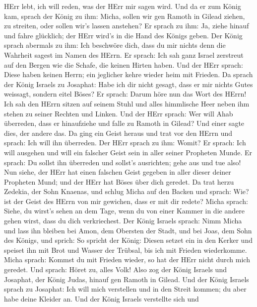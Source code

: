 HErr lebt, ich will reden, was der HErr mir sagen wird. 
Und da er zum König kam, sprach der König zu ihm: Micha, sollen wir gen
Ramoth in Gilead ziehen, zu streiten, oder sollen wir's lassen anstehen?
Er sprach zu ihm: Ja, ziehe hinauf und fahre glücklich; der HErr wird's
in die Hand des Königs geben.  Der König sprach abermals zu
ihm: Ich beschwöre dich, dass du mir nichts denn die Wahrheit sagest im
Namen des HErrn.  Er sprach: Ich sah ganz Israel zerstreut
auf den Bergen wie die Schafe, die keinen Hirten haben. Und der HErr
sprach: Diese haben keinen Herrn; ein jeglicher kehre wieder heim mit
Frieden.  Da sprach der König Israels zu Josaphat: Habe ich
dir nicht gesagt, dass er mir nichts Gutes weissagt, sondern eitel
Böses?  Er sprach: Darum höre nun das Wort des HErrn! Ich
sah den HErrn sitzen auf seinem Stuhl und alles himmlische Heer neben
ihm stehen zu seiner Rechten und Linken.  Und der HErr
sprach: Wer will Ahab überreden, dass er hinaufziehe und falle zu Ramoth
in Gilead? Und einer sagte dies, der andere das.  Da ging
ein Geist heraus und trat vor den HErrn und sprach: Ich will ihn
überreden. Der HErr sprach zu ihm: Womit?  Er sprach: Ich
will ausgehen und will ein falscher Geist sein in aller seiner Propheten
Munde. Er sprach: Du sollst ihn überreden und sollst's ausrichten; gehe
aus und tue also!  Nun siehe, der HErr hat einen falschen
Geist gegeben in aller dieser deiner Propheten Mund; und der HErr hat
Böses über dich geredet.  Da trat herzu Zedekia, der Sohn
Knaenas, und schlug Micha auf den Backen und sprach: Wie? ist der Geist
des HErrn von mir gewichen, dass er mit dir redete?  Micha
sprach: Siehe, du wirst's sehen an dem Tage, wenn du von einer Kammer in
die andere gehen wirst, dass du dich verkriechest.  Der
König Israels sprach: Nimm Micha und lass ihn bleiben bei Amon, dem
Obersten der Stadt, und bei Joas, dem Sohn des Königs,  und
sprich: So spricht der König: Diesen setzet ein in den Kerker und
speiset ihn mit Brot und Wasser der Trübsal, bis ich mit Frieden
wiederkomme.  Micha sprach: Kommst du mit Frieden wieder,
so hat der HErr nicht durch mich geredet. Und sprach: Höret zu, alles
Volk!  Also zog der König Israels und Josaphat, der König
Judas, hinauf gen Ramoth in Gilead.  Und der König Israels
sprach zu Josaphat: Ich will mich verstellen und in den Streit kommen;
du aber habe deine Kleider an. Und der König Israels verstellte sich und
